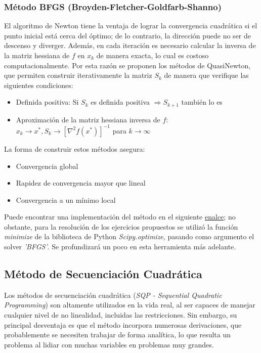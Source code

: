 \documentclass[titlepage, 11pt]{scrartcl}
\begin{document}
	\subsubsection{Método BFGS (Broyden-Fletcher-Goldfarb-Shanno)}
		El algoritmo de Newton tiene la ventaja de lograr la convergencia cuadrática si el punto inicial está cerca del óptimo; de lo contrario, la dirección puede no ser de descenso y diverger. Además, en cada iteración es necesario calcular la inversa de la matriz hessiana de $f$ en $x_k$ de manera exacta, lo cual es costoso computacionalmente. Por esta razón se proponen los métodos de QuasiNewton, que permiten construir iterativamente la matriz $S_k$ de manera que verifique las siguientes condiciones:
		\begin{itemize}
			\item Definida positiva: Si $S_k$ es definida positiva $\Rightarrow S_{k+1}$ también lo es
			\item Aproximación de la matriz hessiana inversa de $f$: $x_k \rightarrow x^*, S_k \rightarrow [\nabla^2f(x^*)]^{-1}$ para $k \rightarrow \infty$
		\end{itemize}
	
		La forma de construir estos métodos asegura:
		\begin{itemize}
			\item Convergencia global
			\item Rapidez de convergencia mayor que lineal
			\item Convergencia a un mínimo local
		\end{itemize}
		Puede encontrar una implementación del método en el siguiente \href{methods.py}{enalce}; no obstante, para la resolución de los ejercicios propuestos se utilizó la función \textit{minimize} de la biblioteca de Python \textit{Scipy.optimize}, pasando como argumento el solver \textit{'BFGS'}. Se profundizará un poco en esta herramienta más adelante.
		
	\subsection{Método de Secuenciación Cuadrática}
	Los métodos de secuenciación cuadrática (\textit{SQP - Sequential Quadratic Programming}) son altamente utilizados en la vida real, al ser capaces de manejar cualquier nivel de no linealidad, incluidas las restricciones. Sin embargo, su principal desventaja es que el método incorpora numerosas derivaciones, que probablemente se necesiten trabajar de forma analítica, lo que resulta un problema al lidiar con muchas variables en problemas muy grandes.
	
\end{document}
